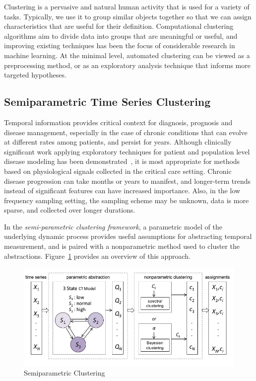 Clustering is a pervasive and natural human activity that is used for a variety of tasks. Typically, we use it to group similar objects together so that we can assign characteristics that are useful for their definition.  %
Computational clustering algorithms aim to divide data into groups that are meaningful or useful, and improving existing techniques has been the focus of considerable research in machine learning.  At the minimal level, automated clustering can be viewed as a preprocessing method, or as an exploratory analysis technique that informs more targeted hypotheses.

\subsection{Semiparametric Time Series Clustering}
Temporal information provides critical context for diagnosis, prognosis and disease management, especially in the case of chronic conditions that can evolve at different rates among patients, and persist for years.   Although clinically significant work applying exploratory techniques for patient and population level disease modeling has been demonstrated~\cite{Saria09,Marlin12}, it is most appropriate for methods based on physiological signals collected in the critical care setting.  Chronic disease progression can take months or years to manifest, and longer-term trends instead of significant features can have increased importance.  Also, in the low frequency sampling setting, the sampling scheme may be unknown, data is more sparse, and collected over longer durations.

In the \emph{semi-parametric clustering framework}, a parametric model of the underlying dynamic process provides useful assumptions for abstracting temporal measurement, and is paired with a nonparametric method used to cluster the abstractions.  Figure~\ref{semipar} provides an overview of this approach.

\begin{figure}[t]
\vskip 0.2in
\begin{center}
\centerline{\includegraphics[width=\columnwidth]{fig/semipoverview.jpg}}
\caption{Semiparametric Clustering}
\label{semipar}
\end{center}
\vskip -0.2in
\end{figure}

